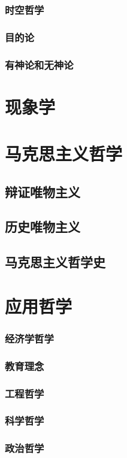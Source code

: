 \documentclass[UTF8]{../RepresentationUniverse}
\begin{document}
    \subsection{时空哲学}
    \subsection{目的论}
    \subsection{有神论和无神论}


\chapter{现象学}


\chapter{马克思主义哲学}
    \section{辩证唯物主义}
    \section{历史唯物主义}
    \section{马克思主义哲学史}




\chapter{应用哲学}
    \subsection{经济学哲学}
    \subsection{教育理念}
    \subsection{工程哲学}
    \subsection{科学哲学}
    \subsection{政治哲学}
\end{document}
